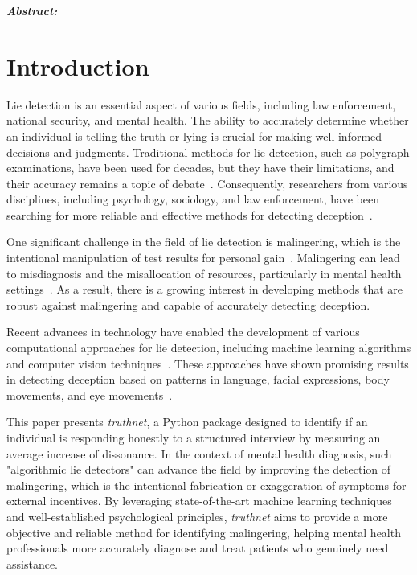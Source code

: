 \documentclass[onecolumn, compsoc,10pt]{IEEEtran}
\begin{document}
  
\maketitle  

{\bf \sffamily \fontsize{10}{12}\selectfont \noindent   
  {\normalfont \itshape Abstract:}

}
  
\vspace{10pt} 


\section*{Introduction}

Lie detection is an essential aspect of various fields, including law enforcement, national security, and mental health. The ability to accurately determine whether an individual is telling the truth or lying is crucial for making well-informed decisions and judgments. Traditional methods for lie detection, such as polygraph examinations, have been used for decades, but they have their limitations, and their accuracy remains a topic of debate~\cite{Ganslen1990}. Consequently, researchers from various disciplines, including psychology, sociology, and law enforcement, have been searching for more reliable and effective methods for detecting deception~\cite{DePaulo2003}.

One significant challenge in the field of lie detection is malingering, which is the intentional manipulation of test results for personal gain~\cite{Rogers1997}. Malingering can lead to misdiagnosis and the misallocation of resources, particularly in mental health settings~\cite{rogers2008clinical}. As a result, there is a growing interest in developing methods that are robust against malingering and capable of accurately detecting deception.

Recent advances in technology have enabled the development of various computational approaches for lie detection, including machine learning algorithms and computer vision techniques~\cite{Chan2018, Wang2020, Lee2019}. These approaches have shown promising results in detecting deception based on patterns in language, facial expressions, body movements, and eye movements~\cite{Yu2018, Ducharme2017}.

This paper presents \textit{truthnet}, a Python package designed to identify if an individual is responding honestly to a structured interview by measuring an average increase of dissonance. In the context of mental health diagnosis, such "algorithmic lie detectors" can advance the field by improving the detection of malingering, which is the intentional fabrication or exaggeration of symptoms for external incentives. By leveraging state-of-the-art machine learning techniques and well-established psychological principles, \textit{truthnet} aims to provide a more objective and reliable method for identifying malingering, helping mental health professionals more accurately diagnose and treat patients who genuinely need assistance.
\end{document}
